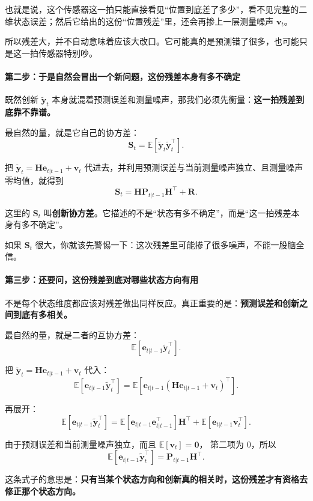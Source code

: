 \documentclass[12pt,a4paper]{ctexart}
\begin{document}
也就是说，这个传感器这一拍只能直接看见“位置到底差了多少”，看不见完整的二维状态误差；然后它给出的这份“位置残差”里，还会再掺上一层测量噪声
\(\bm{v}_t\)。

所以残差大，并不自动意味着应该大改口。它可能真的是预测错了很多，也可能只是这一拍传感器特别吵。

\paragraph{第二步：于是自然会冒出一个新问题，这份残差本身有多不确定}

既然创新
\(\tilde{\bm{y}}_t\)
本身就混着预测误差和测量噪声，那我们必须先衡量：\textbf{这一拍残差到底靠不靠谱。}

最自然的量，就是它自己的协方差：
\[
\bm{S}_t
= \mathbb{E}[\tilde{\bm{y}}_t\tilde{\bm{y}}_t^\top].
\]

把
\(\tilde{\bm{y}}_t = \bm{H}\bm{e}_{t|t-1} + \bm{v}_t\)
代进去，并利用预测误差与当前测量噪声独立、且测量噪声零均值，就得到
\[
\bm{S}_t
= \bm{H}\bm{P}_{t|t-1}\bm{H}^\top + \bm{R}.
\]

这里的
\(\bm{S}_t\)
叫\textbf{创新协方差}。它描述的不是“状态有多不确定”，而是“这一拍残差本身有多不确定”。

如果
\(\bm{S}_t\)
很大，你就该先警惕一下：这次残差里可能掺了很多噪声，不能一股脑全信。

\paragraph{第三步：还要问，这份残差到底对哪些状态方向有用}

不是每个状态维度都应该对残差做出同样反应。真正重要的是：\textbf{预测误差和创新之间到底有多相关。}

最自然的量，就是二者的互协方差：
\[
\mathbb{E}[\bm{e}_{t|t-1}\tilde{\bm{y}}_t^\top].
\]

把
\(\tilde{\bm{y}}_t = \bm{H}\bm{e}_{t|t-1} + \bm{v}_t\)
代入：
\[
\mathbb{E}[\bm{e}_{t|t-1}\tilde{\bm{y}}_t^\top]
= \mathbb{E}[\bm{e}_{t|t-1}(\bm{H}\bm{e}_{t|t-1}+\bm{v}_t)^\top].
\]

再展开：
\[
\mathbb{E}[\bm{e}_{t|t-1}\tilde{\bm{y}}_t^\top]
= \mathbb{E}[\bm{e}_{t|t-1}\bm{e}_{t|t-1}^\top]\bm{H}^\top
+ \mathbb{E}[\bm{e}_{t|t-1}\bm{v}_t^\top].
\]

由于预测误差和当前测量噪声独立，而且
\(\mathbb{E}[\bm{v}_t]=\bm{0}\)，
第二项为 0，所以
\[
\mathbb{E}[\bm{e}_{t|t-1}\tilde{\bm{y}}_t^\top]
= \bm{P}_{t|t-1}\bm{H}^\top.
\]

这条式子的意思是：\textbf{只有当某个状态方向和创新真的相关时，这份残差才有资格去修正那个状态方向。}
\end{document}
